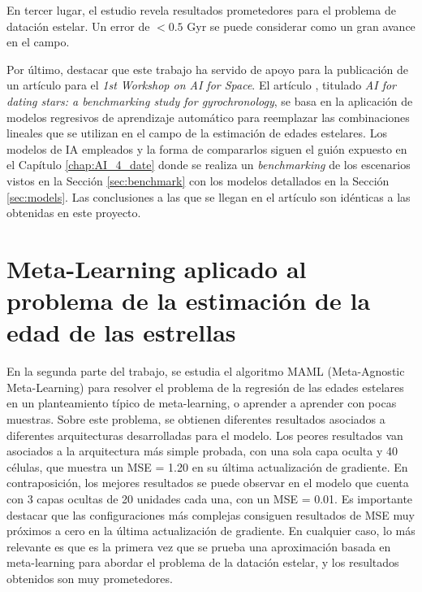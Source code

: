 En tercer lugar, el estudio revela resultados prometedores para el problema de datación estelar. Un error de $<0.5$ Gyr se puede considerar como un gran avance en el campo.

Por último, destacar que este trabajo ha servido de apoyo para la publicación de un artículo para el \emph{1st Workshop on AI for Space}. El artículo \citep{AI4STARTS} , titulado \emph{AI for dating stars: a benchmarking study for gyrochronology}, se basa en la aplicación de modelos regresivos de aprendizaje automático para reemplazar las combinaciones lineales que se utilizan en el campo de la estimación de edades estelares. Los modelos de IA empleados y la forma de compararlos siguen el guión expuesto en el Capítulo \ref{chap:AI_4_date} donde se realiza un \emph{benchmarking} de los escenarios vistos en la Sección \ref{sec:benchmark} con los modelos detallados en la Sección \ref{sec:models}. Las conclusiones a las que se llegan en el artículo son idénticas a las obtenidas en este proyecto.


\section{Meta-Learning aplicado al problema de la estimación de la edad de las estrellas}

En la segunda parte del trabajo, se estudia el algoritmo MAML (Meta-Agnostic Meta-Learning) para resolver el problema de la regresión de las edades estelares en un planteamiento típico de meta-learning, o aprender a aprender con pocas muestras. Sobre este problema, se obtienen diferentes resultados asociados a diferentes arquitecturas desarrolladas para el modelo. Los peores resultados van asociados a la arquitectura más simple probada, con una sola capa oculta y 40 células,  que muestra un MSE = 1.20 en su última actualización de gradiente. En contraposición, los mejores resultados se puede observar en el modelo que cuenta con 3 capas ocultas de 20 unidades cada una, con un MSE = 0.01. 
Es importante destacar que las configuraciones más complejas consiguen resultados de MSE muy próximos a cero en la última actualización de gradiente.
En cualquier caso, lo más relevante es que es la primera vez que se prueba una aproximación basada en meta-learning para abordar el problema de la datación estelar, y los resultados obtenidos son muy prometedores.

